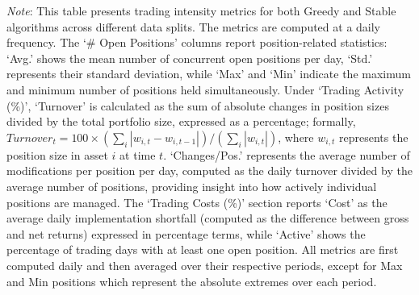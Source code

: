 \begin{table}[htbp]
\vspace{0.5cm}
\begin{minipage}{\textwidth}
\setlength{\parindent}{0pt}
\scriptsize\textit{Note}: 
This table presents trading intensity metrics for both Greedy and Stable algorithms across different data splits. 
The metrics are computed at a daily frequency. The `\# Open Positions' columns report position-related statistics: 
`Avg.' shows the mean number of concurrent open positions per day, `Std.' represents their standard deviation, while 
`Max' and `Min' indicate the maximum and minimum number of positions held simultaneously. Under `Trading Activity (\%)', 
`Turnover' is calculated as the sum of absolute changes in position sizes divided by the total portfolio size, expressed 
as a percentage; formally, $Turnover_t = 100 \times (\sum_i |w_{i,t} - w_{i,t-1}|)/(\sum_i |w_{i,t}|)$, where $w_{i,t}$ 
represents the position size in asset $i$ at time $t$. `Changes/Pos.' represents the average number of modifications per 
position per day, computed as the daily turnover divided by the average number of positions, providing insight into how 
actively individual positions are managed. The `Trading Costs (\%)' section reports `Cost' as the average daily implementation 
shortfall (computed as the difference between gross and net returns) expressed in percentage terms, while `Active' shows 
the percentage of trading days with at least one open position. All metrics are first computed daily and then averaged 
over their respective periods, except for Max and Min positions which represent the absolute extremes over each period.
\end{minipage}
\end{table}